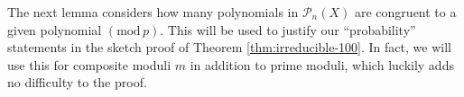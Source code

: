 \documentclass[12pt]{amsart}
\theoremstyle{definition} \newtheorem*{notation}{Notation}
\theoremstyle{remark} \newtheorem*{remark}{Remark}
\theoremstyle{remark} \newtheorem*{example}{Example}
\theoremstyle{definition} \newtheorem*{definition}{Definition}
\numberwithin{equation}{section}
\numberwithin{theorem}{section}
\renewcommand{\pmod}[1]{\left(\mathrm{mod}\,#1\right)}
\begin{document}
	
		
	
	The next lemma considers how many polynomials in $\mathcal{P}_n(X)$ are congruent to a given polynomial $\pmod{p}$.  This will be used to justify our ``probability'' statements in the sketch proof of Theorem \ref{thm:irreducible-100}.  In fact, we will use this for composite moduli $m$ in addition to prime moduli, which luckily adds no difficulty to the proof.
	
\end{document}
